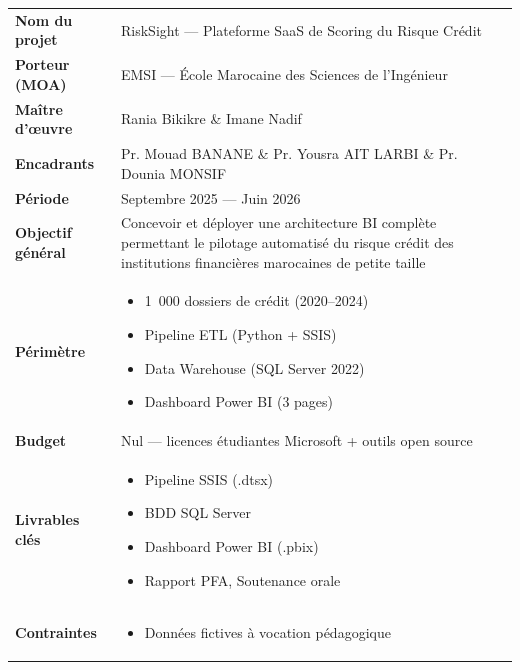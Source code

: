 \documentclass[12pt, a4paper]{report}
\begin{document}
\begin{tcolorbox}[mybox, title={Charte du Projet RiskSight}]
\renewcommand{\arraystretch}{1.2}
\begin{tabularx}{\linewidth}{>{\bfseries\color{primary}}l X}
  Nom du projet     & RiskSight --- Plateforme SaaS de Scoring du Risque Crédit \\
  Porteur (MOA)     & EMSI --- École Marocaine des Sciences de l'Ingénieur \\
  Maître d'œuvre    & Rania Bikikre \& Imane Nadif \\
  Encadrants         & Pr. Mouad BANANE \& Pr. Yousra AIT LARBI \& Pr. Dounia MONSIF \\
  Période           & Septembre 2025 --- Juin 2026 \\
  Objectif général  & Concevoir et déployer une architecture BI complète permettant
                      le pilotage automatisé du risque crédit des institutions
                      financières marocaines de petite taille \\
  Périmètre         & \begin{itemize}[leftmargin=*, nosep]
                        \item 1~000 dossiers de crédit (2020--2024)
                        \item Pipeline ETL (Python + SSIS)
                        \item Data Warehouse (SQL Server 2022)
                        \item Dashboard Power BI (3 pages)
                      \end{itemize} \\
  Budget            & Nul --- licences étudiantes Microsoft + outils open source \\
  Livrables clés    & \begin{itemize}[leftmargin=*, nosep]
                        \item Pipeline SSIS (.dtsx)
                        \item BDD SQL Server
                        \item Dashboard Power BI (.pbix)
                        \item Rapport PFA, Soutenance orale
                      \end{itemize} \\
  Contraintes       & \begin{itemize}[leftmargin=*, nosep]
                        \item Données fictives à vocation pédagogique

\end{itemize}
\end{tabularx}
\end{tcolorbox}
\end{document}
